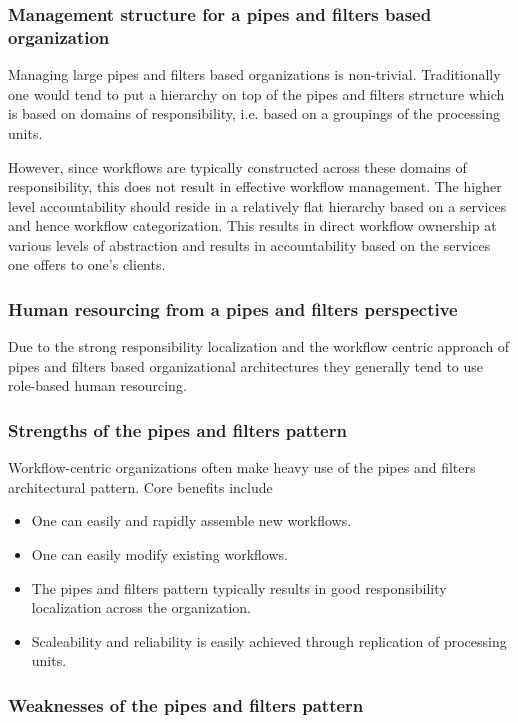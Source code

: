 \documentclass[11pt,english,a4]{article}
\begin{document}
\subsubsection{Management structure for a pipes and filters based organization}

Managing large pipes and filters based organizations is non-trivial. Traditionally one would tend to put a hierarchy on top of the pipes and filters structure which is based on domains of responsibility, i.e. based on a groupings of the processing units.

However, since workflows are typically constructed across these domains of responsibility, this does not result in effective workflow management. The higher level accountability should reside in a relatively flat hierarchy based on a services and hence workflow categorization. This results in direct workflow ownership at various levels of abstraction and results in accountability based on the services one offers to one's clients.

\subsubsection{Human resourcing from a pipes and filters perspective}

Due to the strong responsibility localization and the workflow centric approach of pipes and filters based organizational architectures they generally tend to use role-based human resourcing.

\subsubsection{Strengths of the pipes and filters pattern}

Workflow-centric organizations often make heavy use of the pipes and filters architectural pattern. Core benefits include 
\begin{itemize}
  \item One can easily and rapidly assemble new workflows.
  \item One can easily modify existing workflows.
  \item The pipes and filters pattern typically results in good responsibility localization across the organization.
  \item Scaleability and reliability is easily achieved through replication of processing units.
\end{itemize}

\subsubsection{Weaknesses of the pipes and filters pattern}
\end{document}
